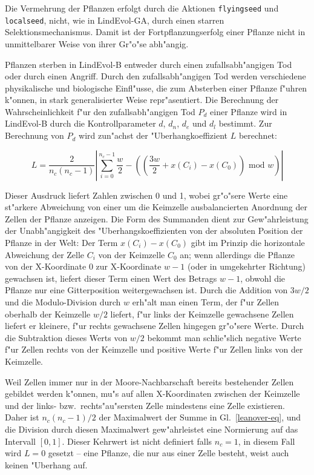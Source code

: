 Die Vermehrung der Pflanzen erfolgt durch die Aktionen \verb|flyingseed|
und \verb|localseed|, nicht, wie in LindEvol-GA, durch einen starren
Selektionsmechanismus. Damit ist der Fortpflanzungserfolg einer Pflanze
nicht in unmittelbarer Weise von ihrer Gr"o"se abh"angig.

Pflanzen sterben in LindEvol-B entweder durch einen zufallsabh"angigen
Tod oder durch einen Angriff. Durch den zufallsabh"angigen Tod werden
verschiedene physikalische und biologische Einfl"usse, die zum Absterben
einer Pflanze f"uhren k"onnen, in stark generalisierter Weise repr"asentiert.
Die Berechnung der Wahrscheinlichkeit f"ur den zufallsabh"angigen Tod $P_d$
einer Pflanze wird in LindEvol-B durch die Kontrollparameter $d$, $d_n$, $d_e$
und $d_l$ bestimmt. Zur Berechnung von $P_d$ wird zun"achst der "Uberhangkoeffizient
$L$ berechnet:

\begin{equation}
\label{leanover-eq}
L = \frac{2}{n_c(n_c - 1)} \left| \sum_{i=0}^{n_c-1} \frac{w}{2} - ((\frac{3w}{2} + x(C_i) - x(C_0)) \mbox{ mod } w) \right|
\end{equation}

Dieser Ausdruck liefert Zahlen zwischen 0 und 1, wobei gr"o"sere Werte eine st"arkere
Abweichung von einer um die Keimzelle ausbalancierten Anordnung der Zellen der Pflanze
anzeigen. Die Form des Summanden dient zur Gew"ahrleistung der Unabh"angigkeit
des "Uberhangskoeffizienten von der absoluten Position der Pflanze in der Welt:
Der Term $x(C_i) - x(C_0)$ gibt im Prinzip die horizontale Abweichung der Zelle $C_i$
von der Keimzelle $C_0$ an; wenn allerdings die Pflanze von der X-Koordinate 0
zur X-Koordinate $w - 1$ (oder in umgekehrter Richtung) gewachsen ist, liefert
dieser Term einen Wert des Betrags $w - 1$, obwohl die Pflanze nur eine Gitterposition
weitergewachsen ist. Durch die Addition von $3w / 2$ und die Modulo-Division durch
$w$ erh"alt man einen Term, der f"ur Zellen oberhalb der Keimzelle $w/2$ liefert,
f"ur links der Keimzelle gewachsene Zellen liefert er kleinere, f"ur rechts gewachsene
Zellen hingegen gr"o"sere Werte. Durch die Subtraktion dieses Werts von $w / 2$
bekommt man schlie"slich negative Werte f"ur Zellen rechts von der Keimzelle und
positive Werte f"ur Zellen links von der Keimzelle.

Weil Zellen immer nur in der Moore-Nachbarschaft bereits bestehender Zellen gebildet
werden k"onnen, mu"s auf allen X-Koordinaten zwischen der Keimzelle und der
links- bzw.\ rechts"au"sersten Zelle mindestens eine Zelle existieren. Daher ist
$n_c(n_c - 1) / 2$ der Maximalwert der Summe in Gl.\ \ref{leanover-eq}, und die
Division durch diesen Maximalwert gew"ahrleistet eine Normierung auf das Intervall
$[0, 1]$. Dieser Kehrwert ist nicht definiert falls $n_c = 1$, in diesem Fall
wird $L = 0$ gesetzt -- eine Pflanze, die nur aus einer Zelle besteht, weist
auch keinen "Uberhang auf.

